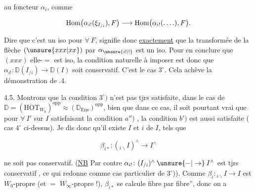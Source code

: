 au foncteur $\alpha_i$, comme

\[
 \operatorname{Hom}\bigl(\alpha_{i!}(\xi_{I_{/i}}),F\bigr)\longrightarrow
 \operatorname{Hom}\bigl(\alpha_{i!}(\mathinner{.\,.\,.\,.}),F\bigr).
\]

Dire que c'est un iso pour $\forall\ F$, signifie donc \uline{exactement} que la transformée de la flèche $(\unsure{xxx|xx})$ par $\alpha_{\unsure{i!|!}}$ est un iso. Pour en conclure que $(xxx)$ elle-$=$ est iso, la condition naturelle à imposer  est donc que $\alpha_{i!}\colon\mathbb{D}(I_{/i})\to\mathbb{D}(I)$ soit conservatif. C'est le cas $3^\circ$. Cela achève la démonstration de .4.

4.5. Montrons que la condition $3^\circ)$  n'est pas tjrs satisfaite, dans le cas de $\mathbb{D}=(\mathrm{HOT}_{W_0})^{\mathrm{opp}}\approx (\mathbb{D}_{\mathrm{Ens}})^{\mathrm{opp}}$, bien que dans ce cas, il soit pourtant  vrai que pour $\forall\ I'$ sur $I$ satisfaisant la condition $a'')$ , la condition $b')$  est aussi satisfaite ( cas $4^\circ$ ci-dessus). Je dis donc qu'il existe $I$ et $i$ de $I$, tels que

\[
 \beta_{i*}\colon({}_{i\backslash}I)^\wedge\longrightarrow I^\wedge
\]

ne soit pas conservatif. (\uline{NB} Par contre $\alpha_{i!}\colon(I_{/i})^\wedge\mathbin{\unsure{-|\to}}I^\wedge$ est tjrs conservatif , ce qui  redonne   comme cas particulier de $3^\circ$)). Comme $\beta_i\colon{}_{i\backslash}I\longrightarrow I$ est $W_0$-propre (et $=$ $W_\infty$-propre !), $\beta_{i*}$  se calcule fibre par fibre'', donc on a
